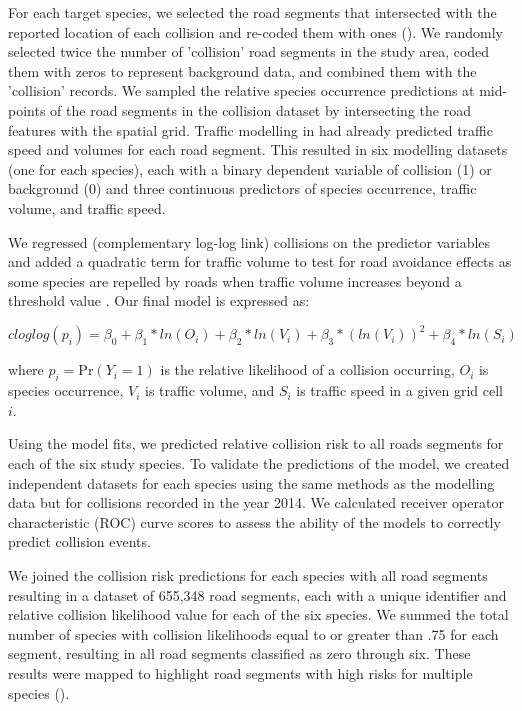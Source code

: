 For each target species, we selected the road segments that intersected with the reported location of each collision and re-coded them with ones ().  We randomly selected twice the number of 'collision' road segments in the study area, coded them with zeros to represent background data, and combined them with the 'collision' records.  We sampled the relative species occurrence predictions at mid-points of the road segments in the collision dataset by intersecting the road features with the spatial grid.  Traffic modelling in  had already predicted traffic speed and volumes for each road segment.  This resulted in six modelling datasets (one for each species), each with a binary dependent variable of collision (1) or background (0) and three continuous predictors of species occurrence, traffic volume, and traffic speed.

We regressed (complementary log-log link) collisions on the predictor variables and added a quadratic term for traffic volume to test for road avoidance effects as some species are repelled by roads when traffic volume increases beyond a threshold value \citep{seil05,gagn07}. Our final model is expressed as: 

\begin{equation}
cloglog(p_i) = \beta_0 + \beta_1*ln(O_i) + \beta_2*ln(V_i) + \beta_3*(ln(V_i))^2 + \beta_4*ln(S_i)
\end{equation}

\noindent where $p_i=\text{Pr}(Y_i=1)$ is the relative likelihood of a collision occurring, $O_i$ is species occurrence, $V_i$ is traffic volume, and $S_i$ is traffic speed in a given grid cell $i$.

Using the model fits, we predicted relative collision risk to all roads segments for each of the six study species.  To validate the predictions of the model, we created independent datasets for each species using the same methods as the modelling data but for collisions recorded in the year 2014.  We calculated receiver operator characteristic (ROC) curve scores \citep{metz78} to assess the ability of the models to correctly predict collision events.

We joined the collision risk predictions for each species with all road segments resulting in a dataset of 655,348 road segments, each with a unique identifier and relative collision likelihood value for each of the six species.  We summed the total number of species with collision likelihoods equal to or greater than .75 for each segment, resulting in all road segments classified as zero through six.  These results were mapped to highlight road segments with high risks for multiple species ().

